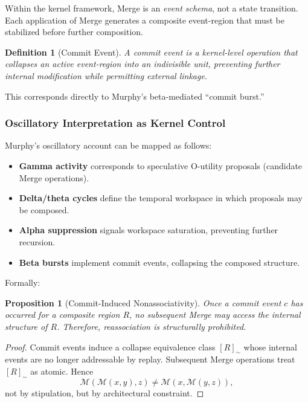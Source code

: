 \documentclass[11pt]{article}
\newtheorem{definition}{Definition}
\newtheorem{proposition}{Proposition}
\begin{document}
Within the kernel framework, Merge is an \emph{event schema}, not a state transition. Each application of Merge generates a composite event-region that must be stabilized before further composition.

\begin{definition}[Commit Event]
A \emph{commit event} is a kernel-level operation that collapses an active event-region into an indivisible unit, preventing further internal modification while permitting external linkage.
\end{definition}

This corresponds directly to Murphy’s beta-mediated “commit burst.”

\subsubsection{Oscillatory Interpretation as Kernel Control}

Murphy’s oscillatory account can be mapped as follows:

\begin{itemize}
  \item \textbf{Gamma activity} corresponds to speculative O-utility proposals (candidate Merge operations).
  \item \textbf{Delta/theta cycles} define the temporal workspace in which proposals may be composed.
  \item \textbf{Alpha suppression} signals workspace saturation, preventing further recursion.
  \item \textbf{Beta bursts} implement commit events, collapsing the composed structure.
\end{itemize}

Formally:

\begin{proposition}[Commit-Induced Nonassociativity]
\label{prop:nonassoc}
Once a commit event $c$ has occurred for a composite region $R$, no subsequent Merge may access the internal structure of $R$. Therefore, reassociation is structurally prohibited.
\end{proposition}

\begin{proof}
Commit events induce a collapse equivalence class $[R]_{\sim}$ whose internal events are no longer addressable by replay. Subsequent Merge operations treat $[R]_{\sim}$ as atomic. Hence
\[
\mathcal{M}(\mathcal{M}(x,y),z) \neq \mathcal{M}(x,\mathcal{M}(y,z)),
\]
not by stipulation, but by architectural constraint.
\end{proof}
\end{document}

